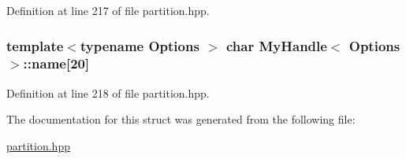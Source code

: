 Definition at line 217 of file partition.hpp.\hypertarget{struct_my_handle_a37fc6e74a0be8f6d8a990c033ed7ee55}{
\subsubsection[{name}]{\setlength{\rightskip}{0pt plus 5cm}template$<$typename Options $>$ char {\bf MyHandle}$<$ {\bf Options} $>$::{\bf name}\mbox{[}20\mbox{]}}}
\label{struct_my_handle_a37fc6e74a0be8f6d8a990c033ed7ee55}


Definition at line 218 of file partition.hpp.

The documentation for this struct was generated from the following file:\begin{DoxyCompactItemize}
\item 
\hyperlink{partition_8hpp}{partition.hpp}\end{DoxyCompactItemize}
